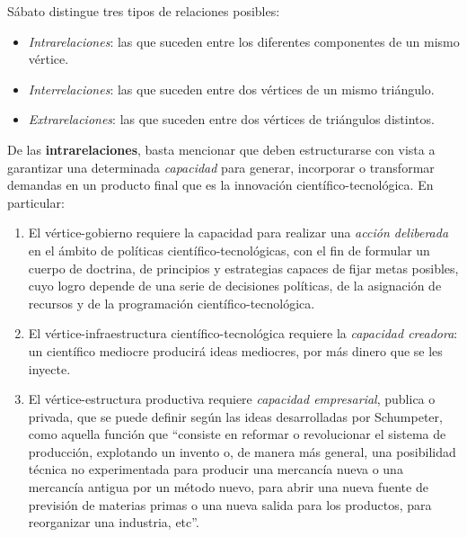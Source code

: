Sábato distingue tres tipos de relaciones posibles:

\begin{itemize}
    \item \textit{Intrarelaciones}: las que suceden entre los diferentes componentes de un mismo vértice.
    \item \textit{Interrelaciones}: las que suceden entre dos vértices de un mismo triángulo.
    \item \textit{Extrarelaciones}: las que suceden entre dos vértices de triángulos distintos.
\end{itemize}

De las \textbf{intrarelaciones}, basta mencionar que deben estructurarse con vista a garantizar una determinada \textit{capacidad} para generar, incorporar o transformar demandas en un producto final que es la innovación científico-tecnológica. En particular:


\begin{enumerate}
    \item El vértice-gobierno requiere la capacidad para realizar una \textit{acción deliberada} en el ámbito de políticas científico-tecnológicas, con el fin de formular un cuerpo de doctrina, de principios y estrategias capaces de fijar metas posibles, cuyo logro depende de una serie de decisiones políticas, de la asignación de recursos y de la programación científico-tecnológica.
    \item El vértice-infraestructura científico-tecnológica requiere la \textit{capacidad creadora}: un científico mediocre producirá ideas mediocres, por más dinero que se les inyecte.
    \item El vértice-estructura productiva requiere \textit{capacidad empresarial}, publica o privada, que se puede definir según las ideas desarrolladas por Schumpeter, como aquella función que ``consiste en reformar o revolucionar el sistema de producción, explotando un invento o, de manera más general, una posibilidad técnica no experimentada para producir una mercancía nueva o una mercancía antigua por un método nuevo, para abrir una nueva fuente de previsión de materias primas o una nueva salida para los productos, para reorganizar una industria, etc''.
\end{enumerate}

